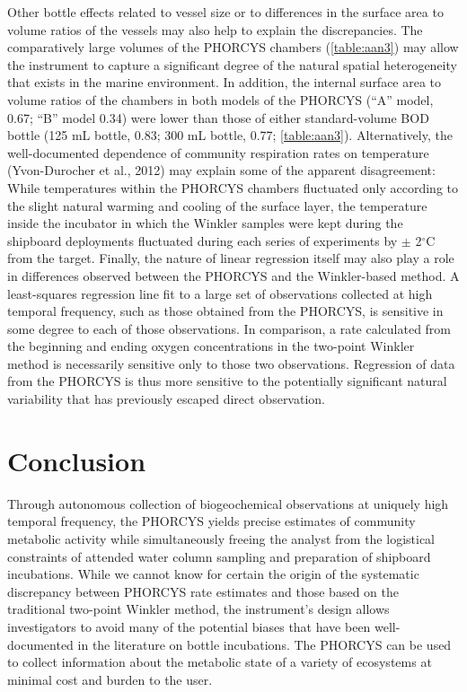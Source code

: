 Other bottle effects related to vessel size or to differences in the surface area to volume ratios of the vessels may also help to explain the discrepancies. The comparatively large volumes of the PHORCYS chambers (\autoref{table:aan3}) may allow the instrument to capture a significant degree of the natural spatial heterogeneity that exists in the marine environment. In addition, the internal surface area to volume ratios of the chambers in both models of the PHORCYS (``A'' model, 0.67; ``B'' model 0.34) were lower than those of either standard-volume BOD bottle (125 mL bottle, 0.83; 300 mL bottle, 0.77; \autoref{table:aan3}). Alternatively, the well-documented dependence of community respiration rates on temperature (Yvon-Durocher et al., 2012) may explain some of the apparent disagreement: While temperatures within the PHORCYS chambers fluctuated only according to the slight natural warming and cooling of the surface layer, the temperature inside the incubator in which the Winkler samples were kept during the shipboard deployments fluctuated during each series of experiments by $\pm$ 2$^{\circ}$C from the target. Finally, the nature of linear regression itself may also play a role in differences observed between the PHORCYS and the Winkler-based method. A least-squares regression line fit to a large set of observations collected at high temporal frequency, such as those obtained from the PHORCYS, is sensitive in some degree to each of those observations. In comparison, a rate calculated from the beginning and ending oxygen concentrations in the two-point Winkler method is necessarily sensitive only to those two observations. Regression of data from the PHORCYS is thus more sensitive to the potentially significant natural variability that has previously escaped direct observation.
\section{Conclusion}
Through autonomous collection of biogeochemical observations at uniquely high temporal frequency, the PHORCYS yields precise estimates of community metabolic activity while simultaneously freeing the analyst from the logistical constraints of attended water column sampling and preparation of shipboard incubations. While we cannot know for certain the origin of the systematic discrepancy between PHORCYS rate estimates and those based on the traditional two-point Winkler method, the instrument's design allows investigators to avoid many of the potential biases that have been well-documented in the literature on bottle incubations. The PHORCYS can be used to collect information about the metabolic state of a variety of ecosystems at minimal cost and burden to the user.
